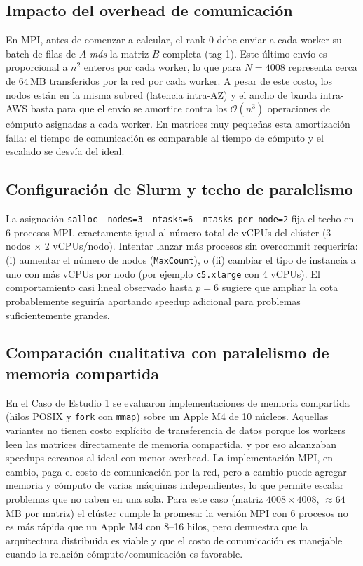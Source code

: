 \documentclass{article}
\begin{document}
\subsection{Impacto del overhead de comunicación}

En MPI, antes de comenzar a calcular, el rank 0 debe enviar a cada worker su batch de filas de $A$ \emph{más} la matriz $B$ completa (tag 1). Este último envío es proporcional a $n^2$ enteros por cada worker, lo que para $N = 4008$ representa cerca de 64\,MB transferidos por la red por cada worker. A pesar de este costo, los nodos están en la misma subred (latencia intra-AZ) y el ancho de banda intra-AWS basta para que el envío se amortice contra los $\mathcal{O}(n^3)$ operaciones de cómputo asignadas a cada worker. En matrices muy pequeñas esta amortización falla: el tiempo de comunicación es comparable al tiempo de cómputo y el escalado se desvía del ideal.

\subsection{Configuración de Slurm y techo de paralelismo}

La asignación \texttt{salloc --nodes=3 --ntasks=6 --ntasks-per-node=2} fija el techo en 6 procesos MPI, exactamente igual al número total de vCPUs del clúster (3 nodos $\times$ 2 vCPUs/nodo). Intentar lanzar más procesos sin overcommit requeriría: (i) aumentar el número de nodos (\texttt{MaxCount}), o (ii) cambiar el tipo de instancia a uno con más vCPUs por nodo (por ejemplo \texttt{c5.xlarge} con 4 vCPUs). El comportamiento casi lineal observado hasta $p = 6$ sugiere que ampliar la cota probablemente seguiría aportando speedup adicional para problemas suficientemente grandes.

\subsection{Comparación cualitativa con paralelismo de memoria compartida}

En el Caso de Estudio 1 se evaluaron implementaciones de memoria compartida (hilos POSIX y \texttt{fork} con \texttt{mmap}) sobre un Apple M4 de 10 núcleos. Aquellas variantes no tienen costo explícito de transferencia de datos porque los workers leen las matrices directamente de memoria compartida, y por eso alcanzaban speedups cercanos al ideal con menor overhead. La implementación MPI, en cambio, paga el costo de comunicación por la red, pero a cambio puede agregar memoria y cómputo de varias máquinas independientes, lo que permite escalar problemas que no caben en una sola. Para este caso (matriz $4008 \times 4008$, $\approx 64$\,MB por matriz) el clúster cumple la promesa: la versión MPI con 6 procesos no es más rápida que un Apple M4 con 8--16 hilos, pero demuestra que la arquitectura distribuida es viable y que el costo de comunicación es manejable cuando la relación cómputo/comunicación es favorable.
\end{document}
